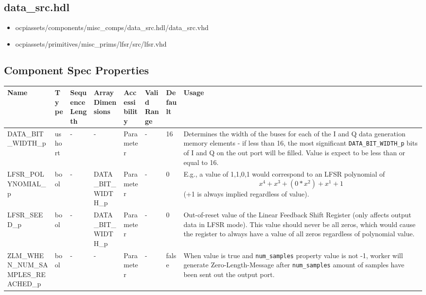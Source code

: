 \documentclass{article}
\def\comp{temp}
\def\comp{data\_src}
\begin{document}
\subsection*{\comp.hdl}
\begin{itemize}
  \item ocpiassets/components/misc\_comps/data\_src.hdl/data\_src.vhd
  \item ocpiassets/primitives/misc\_prims/lfsr/src/lfsr.vhd
\end{itemize}


\begin{landscape}
	\section*{Component Spec Properties}
	\begin{scriptsize}
\begin{tabular}{|p{5.5cm}|p{1.25cm}|p{2cm}|p{2.75cm}|p{1.5cm}|p{1.5cm}|p{1cm}|p{5.25cm}|}
\hline
\rowcolor{blue}
Name                 & Type   & SequenceLength & ArrayDimensions & Accessibility       & Valid Range & Default & Usage
\\
\hline
DATA\_BIT\_WIDTH\_p & ushort  & - & - & Parameter & -  &16 & Determines the width of the buses for each of the I and Q data generation memory elements - if less than 16, the most significant \verb+DATA_BIT_WIDTH_p+ bits of I and Q on the out port will be filled. Value is expect to be less than or equal to 16.
\\
\hline
LFSR\_POLYNOMIAL\_p & bool  & - & DATA\_BIT\_WIDTH\_p & Parameter & -  &0 & E.g., a value of 1,1,0,1 would correspond to an LFSR polynomial of \begin{equation*}x^4 + x^3 + (0*x^2) + x^1 + 1\end{equation*} (+1 is always implied regardless of value).
\\
\hline
LFSR\_SEED\_p & bool  & - & DATA\_BIT\_WIDTH\_p & Parameter & -  &0 & Out-of-reset value of the Linear Feedback Shift Register (only affects output data in LFSR mode). This value should never be all zeros, which would cause the register to always have a value of all zeros regardless of polynomial value.
\\
\hline
ZLM\_WHEN\_NUM\_SAMPLES\_REACHED\_p & bool  & - & - & Parameter & -  &false & When value is true and \verb+num_samples+ property value is not -1, worker will generate Zero-Length-Message after \verb+num_samples+ amount of samples have been sent out the output port.

\end{tabular}
\end{scriptsize}
\end{landscape}
\end{document}
